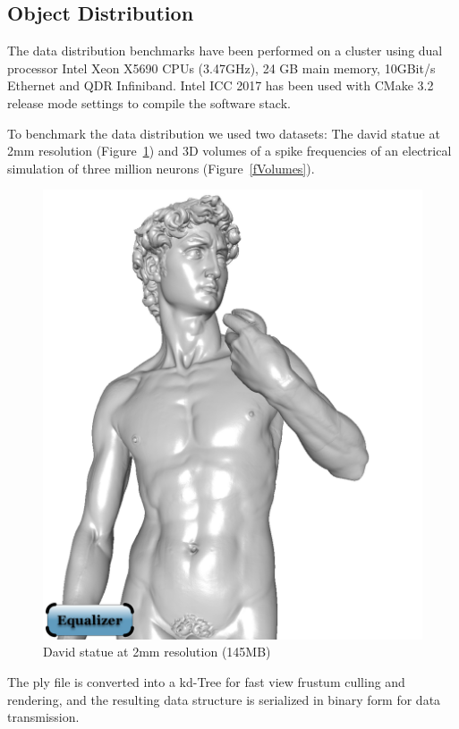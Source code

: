 \documentclass[10pt,journal,compsoc]{IEEEtran}
\newcommand{\fig}[1]{Figure~\ref{#1}}
\begin{document}
\subsection{Object Distribution}

The data distribution benchmarks have been performed on a cluster using
dual processor Intel Xeon X5690 CPUs (3.47GHz), 24 GB main memory, 10GBit/s
Ethernet and QDR Infiniband. Intel ICC 2017 has been used with CMake 3.2 release
mode settings to compile the software stack.

To benchmark the data distribution we used two datasets: The david statue at 2mm
resolution (\fig{fDavid2mm}) and 3D volumes of a spike frequencies of an
electrical simulation of three million neurons (\fig{fVolumes}).

\begin{figure}[ht]\center
  \includegraphics[width=.49\columnwidth]{images/david2mm}
  \caption{\label{fDavid2mm}David statue at 2mm resolution (145MB)}
\end{figure}

The ply file is converted into a kd-Tree for fast view frustum culling and
rendering, and the resulting data structure is serialized in binary form for
data transmission.
\end{document}
